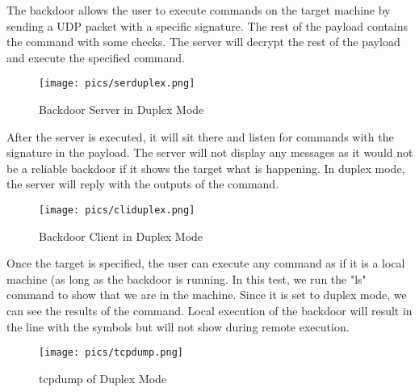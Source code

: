 \documentclass[titlepage]{article}
\begin{document}
The backdoor allows the user to execute commands on the target machine by sending a UDP
packet with a specific signature.  The rest of the payload contains the command with
some checks.  The server will decrypt the rest of the payload and execute the specified
command.\\

\begin{figure}[htb]                                                                       
  \begin{center}
    \texttt{[image: pics/serduplex.png]}
  \end{center}
  \caption{Backdoor Server in Duplex Mode}
  \label{fig:ser_duplex}
\end{figure}

After the server is executed, it will sit there and listen for commands with the signature
in the payload.  The server will not display any messages as it would not be a reliable
backdoor if it shows the target what is happening.  In duplex mode, the server will reply
with the outputs of the command.\\

\begin{figure}[htb]                                                                       
  \begin{center}
    \texttt{[image: pics/cliduplex.png]}
  \end{center}
  \caption{Backdoor Client in Duplex Mode}
  \label{fig:cli_duplex}
\end{figure}

Once the target is specified, the user can execute any command as if it is a local machine
(as long as the backdoor is running. In this test, we run the "ls" command to show that
we are in the machine.  Since it is set to duplex mode, we can see the results of the
command.  Local execution of the backdoor will result in the line with the symbols but
will not show during remote execution.\\

\begin{figure}[htb]                                                                       
  \begin{center}
    \texttt{[image: pics/tcpdump.png]}
  \end{center}
  \caption{tcpdump of Duplex Mode}
  \label{fig:dump_duplex}
\end{figure}
\end{document}
